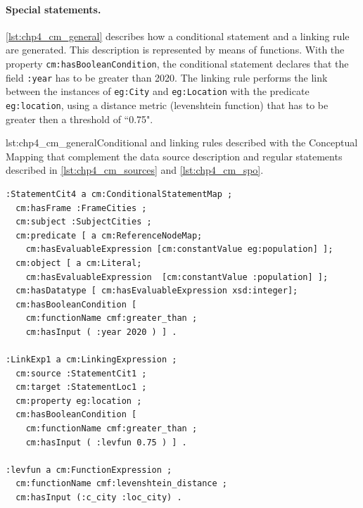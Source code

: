 \noindent\paragraph{\textbf{Special statements.}} \cref{lst:chp4_cm_general} describes how a conditional statement and a linking rule are generated. This description is represented by means of functions. With the property \texttt{cm:hasBooleanCondition}, the conditional statement declares that the field \texttt{:year} has to be greater than 2020. The linking rule performs the link between the instances of \texttt{eg:City} and \texttt{eg:Location} with the predicate \texttt{eg:location}, using a distance metric (levenshtein function) that has to be greater then a threshold of ``0.75". 

\begin{captionedlisting}{lst:chp4_cm_general}{Conditional and linking rules described with the Conceptual Mapping that complement the data source description and regular statements described in \cref{lst:chp4_cm_sources} and \cref{lst:chp4_cm_spo}.}
\centering
{\begin{lstlisting}[language=concm,firstnumber=1]
:StatementCit4 a cm:ConditionalStatementMap ;
  cm:hasFrame :FrameCities ;
  cm:subject :SubjectCities ;
  cm:predicate [ a cm:ReferenceNodeMap; 
    cm:hasEvaluableExpression [cm:constantValue eg:population] ];
  cm:object [ a cm:Literal; 
    cm:hasEvaluableExpression  [cm:constantValue :population] ];
  cm:hasDatatype [ cm:hasEvaluableExpression xsd:integer];
  cm:hasBooleanCondition [
    cm:functionName cmf:greater_than ;
    cm:hasInput ( :year 2020 ) ] .

:LinkExp1 a cm:LinkingExpression ;
  cm:source :StatementCit1 ;
  cm:target :StatementLoc1 ;
  cm:property eg:location ;
  cm:hasBooleanCondition [
    cm:functionName cmf:greater_than ; 
    cm:hasInput ( :levfun 0.75 ) ] .

:levfun a cm:FunctionExpression ;
  cm:functionName cmf:levenshtein_distance ;    
  cm:hasInput (:c_city :loc_city) .
\end{lstlisting}}
\end{captionedlisting}







